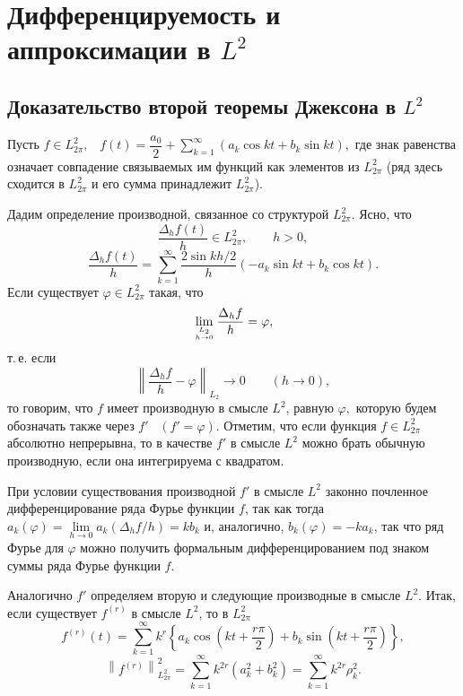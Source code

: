 

\chapter{{Дифференцируемость и аппроксимации в \boldmath $L^2$}}

\section{Доказательство второй теоремы Джексона в ${L^2}$}

Пусть {$f\in L_{2\pi}^2,$~ $f(t)= \dfrac{a_0}{2}+\sum\limits_{k=1}^{\infty}(a_k \cos kt+b_k\sin kt),$ где знак равенства означает совпадение}
{связываемых им функций как элементов из $L_{2\pi}^2$ (ряд здесь сходится в $
L_{2\pi}^2$ и его сумма} {принадлежит $L_{2\pi}^2$).}

Дадим определение производной, связанное со структурой {$L_{2\pi}^2$}. {Ясно, что}
$$
\dfrac{\Delta_h f(t)}{h}\in L_{2\pi}^2,\qquad h>0,
$$
$$
\dfrac{\Delta_h f(t)}{h}=\sum\limits_{k=1}^{\infty}\dfrac{2\sin kh/2}{h}(-a_k\sin kt+b_k\cos kt).
$$
Если существует {$\varphi\in L_{2\pi}^2$ такая, что}
 $$
 \lim\limits_{{L_2}\atop {h\to 0}} \dfrac{\Delta_h f}{h}=\varphi,
 $$
  т.\,е. если
 $$
\left\| \dfrac{\Delta_h f}{h}-\varphi\right\|_{L_2}\to 0\qquad (h\to 0),
$$
 то говорим, что $f$ имеет производную {в смысле $L^2$, равную} $\varphi,$ {которую будем} {обозначать также через $f'$~
$(f'=\varphi).$ Отметим, что если функция $f\in L_{2\pi}^2$ абсолютно} {непрерывна, то в качестве $f'$
в смысле $L^2$ можно брать обычную
производную, если она интегрируема с квадратом.}


{При условии существования производной $f'$ в смысле $L^2$} законно почленное дифференцирование ряда Фурье функции $f$,
{так как тогда
$a_k(\varphi)=\lim\limits_{h\to 0} a_k(\Delta_h f/h)=kb_k$ и, аналогично,} {$b_k(\varphi)=-ka_k$, так что ряд Фурье для $\varphi$ можно
получить формальным} {дифференцированием под знаком суммы ряда Фурье функции $f$.}

Аналогично {$f'$} определяем вторую и следующие
производные {в смысле $L^2$}. Итак, если существует $f^{(r)}$ {в смысле $L^2$,}
то в $L_{2\pi}^2$
$$
f^{(r)}(t)=\sum\limits_{k=1}^{\infty} k^r \left\{ a_k \cos \left( kt+\frac{r\pi}{2}\right)+
b_k \sin \left( kt+\frac{r\pi}{2}\right)\right\},
$$
$$
\left\| f^{(r)}\right\|_{{L_{2\pi}^2}}^2=\sum\limits_{k=1}^{\infty}
k^{2r}(a_k^2+b_k^2)=\sum\limits_{k=1}^{\infty} k^{2r}\rho_k^2.
$$

